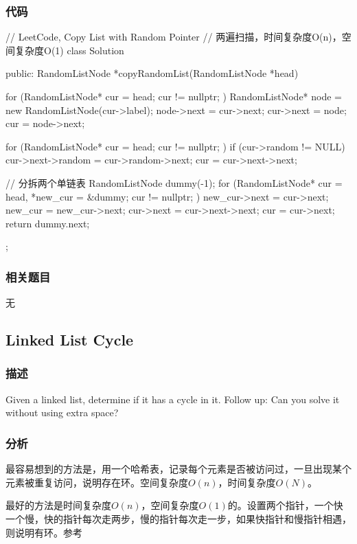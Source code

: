 \subsubsection{代码}
\begin{Code}
	// LeetCode, Copy List with Random Pointer
	// 两遍扫描，时间复杂度O(n)，空间复杂度O(1)
	class Solution {
		public:
		RandomListNode *copyRandomList(RandomListNode *head) {
			for (RandomListNode* cur = head; cur != nullptr; ) {
				RandomListNode* node = new RandomListNode(cur->label);
				node->next = cur->next;
				cur->next = node;
				cur = node->next;
			}
			
			for (RandomListNode* cur = head; cur != nullptr; ) {
				if (cur->random != NULL)
				cur->next->random = cur->random->next;
				cur = cur->next->next;
			}
			
			// 分拆两个单链表
			RandomListNode dummy(-1);
			for (RandomListNode* cur = head, *new_cur = &dummy;
			cur != nullptr; ) {
				new_cur->next = cur->next;
				new_cur = new_cur->next;
				cur->next = cur->next->next;
				cur = cur->next;
			}
			return dummy.next;
		}
	};
\end{Code}


\subsubsection{相关题目}
\begindot
\item 无
\myenddot


\subsection{Linked List Cycle}
\label{sec:Linked-List-Cycle}


\subsubsection{描述}
Given a linked list, determine if it has a cycle in it.
Follow up:
Can you solve it without using extra space?


\subsubsection{分析}
最容易想到的方法是，用一个哈希表，记录每个元素是否被访问过，一旦出现某个元素被重复访问，说明存在环。空间复杂度$O(n)$，时间复杂度$O(N)$。

最好的方法是时间复杂度$O(n)$，空间复杂度$O(1)$的。设置两个指针，一个快一个慢，快的指针每次走两步，慢的指针每次走一步，如果快指针和慢指针相遇，则说明有环。参考


